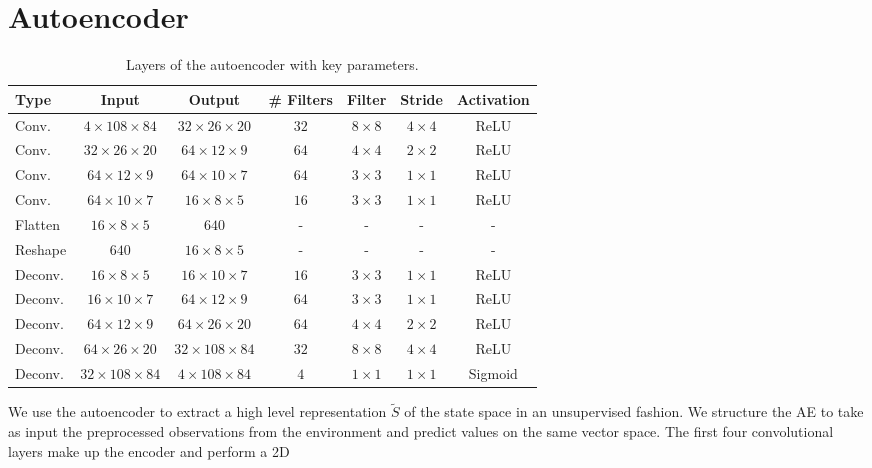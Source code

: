 \section{Autoencoder}\label{s:ae_training_details}
%
\begin{table}
    \centering
    \begin{tabular}{l c c c c c c} 
	\hline
	Type & Input & Output & \# Filters & Filter & Stride & Activation \\ 
	\hline 
	Conv. & $4 \times 108 \times 84$ & $32 \times 26 \times 20$ & $32$ & $8 \times 8$ & $4 \times 4$ & ReLU \\ 
	Conv. & $32 \times 26 \times 20$ & $64 \times 12 \times 9$ & $64$ & $4 \times 4$ & $2 \times 2$ & ReLU \\ 
	Conv. & $64 \times 12 \times 9$ & $64 \times 10 \times 7$ & $64$ & $3 \times 3$ & $1 \times 1$ & ReLU \\ 
	Conv. & $64 \times 10 \times 7$ & $16 \times 8 \times 5$ & $16$ & $3 \times 3$ & $1 \times 1$ & ReLU \\ 
	Flatten	& $16 \times 8 \times 5$ & $640$ & - & - & - & - \\ 
	\hline
	Reshape & $640$ & $16 \times 8 \times 5$ & - & - & - & - \\
	Deconv. & $16 \times 8 \times 5$ & $16 \times 10 \times 7$ & $16$ & $3 \times 3$ & $1 \times 1$ & ReLU \\ 
	Deconv. & $16 \times 10 \times 7$ & $64 \times 12 \times 9$ & $64$ & $3 \times 3$ & $1 \times 1$ & ReLU \\
	Deconv. & $64 \times 12 \times 9$ & $64 \times 26 \times 20$ & $64$ & $4 \times 4$ & $2 \times 2$ & ReLU \\
	Deconv. & $64 \times 26 \times 20$ & $32 \times 108 \times 84$ & $32$ & $8 \times 8$ & $4 \times 4$ & ReLU \\
	Deconv. & $32 \times 108 \times 84$ & $4 \times 108 \times 84$ & $4$ & $1 \times 1$ & $1 \times 1$ & Sigmoid \\
	\hline
    \end{tabular}
    \caption[Layers of the autoencoder with key parameters]{Layers of the 
	    autoencoder with key parameters.}
    \label{t:AE_structure}
\end{table}
%
We use the autoencoder to extract a high level representation $\tilde{S}$ of the
state space in an unsupervised fashion.
We structure the AE to take as input the preprocessed observations from the
environment and predict values on the same vector space.
The first four convolutional layers make up the encoder and perform a 2D 
